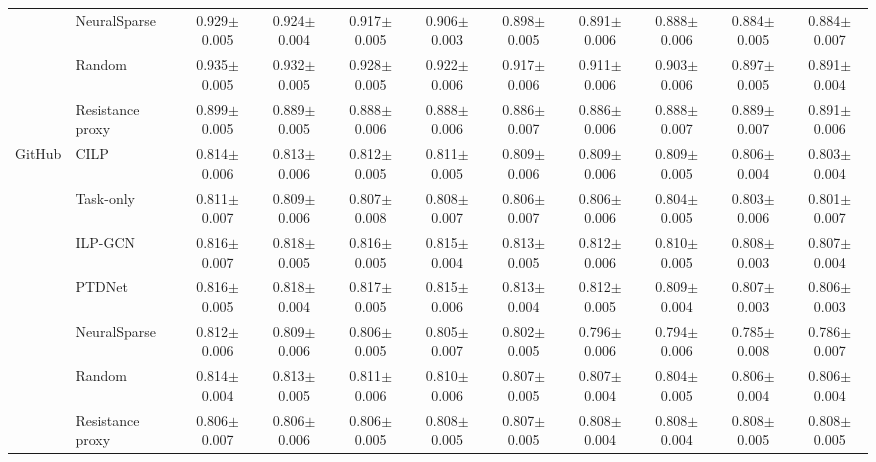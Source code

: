 \begin{center}
\begin{tabular}{@{}llccccccccc@{}}
 & NeuralSparse & 0.929$\pm$0.005 & 0.924$\pm$0.004 & 0.917$\pm$0.005 & 0.906$\pm$0.003 & 0.898$\pm$0.005 & 0.891$\pm$0.006 & 0.888$\pm$0.006 & 0.884$\pm$0.005 & 0.884$\pm$0.007 \\
 & Random & 0.935$\pm$0.005 & 0.932$\pm$0.005 & 0.928$\pm$0.005 & 0.922$\pm$0.006 & 0.917$\pm$0.006 & 0.911$\pm$0.006 & 0.903$\pm$0.006 & 0.897$\pm$0.005 & 0.891$\pm$0.004 \\
 & Resistance proxy & 0.899$\pm$0.005 & 0.889$\pm$0.005 & 0.888$\pm$0.006 & 0.888$\pm$0.006 & 0.886$\pm$0.007 & 0.886$\pm$0.006 & 0.888$\pm$0.007 & 0.889$\pm$0.007 & 0.891$\pm$0.006 \\
\midrule
GitHub & CILP & 0.814$\pm$0.006 & 0.813$\pm$0.006 & 0.812$\pm$0.005 & 0.811$\pm$0.005 & 0.809$\pm$0.006 & 0.809$\pm$0.006 & 0.809$\pm$0.005 & 0.806$\pm$0.004 & 0.803$\pm$0.004 \\
 & Task-only & 0.811$\pm$0.007 & 0.809$\pm$0.006 & 0.807$\pm$0.008 & 0.808$\pm$0.007 & 0.806$\pm$0.007 & 0.806$\pm$0.006 & 0.804$\pm$0.005 & 0.803$\pm$0.006 & 0.801$\pm$0.007 \\
 & ILP-GCN & 0.816$\pm$0.007 & 0.818$\pm$0.005 & 0.816$\pm$0.005 & 0.815$\pm$0.004 & 0.813$\pm$0.005 & 0.812$\pm$0.006 & 0.810$\pm$0.005 & 0.808$\pm$0.003 & 0.807$\pm$0.004 \\
 & PTDNet & 0.816$\pm$0.005 & 0.818$\pm$0.004 & 0.817$\pm$0.005 & 0.815$\pm$0.006 & 0.813$\pm$0.004 & 0.812$\pm$0.005 & 0.809$\pm$0.004 & 0.807$\pm$0.003 & 0.806$\pm$0.003 \\
 & NeuralSparse & 0.812$\pm$0.006 & 0.809$\pm$0.006 & 0.806$\pm$0.005 & 0.805$\pm$0.007 & 0.802$\pm$0.005 & 0.796$\pm$0.006 & 0.794$\pm$0.006 & 0.785$\pm$0.008 & 0.786$\pm$0.007 \\
 & Random & 0.814$\pm$0.004 & 0.813$\pm$0.005 & 0.811$\pm$0.006 & 0.810$\pm$0.006 & 0.807$\pm$0.005 & 0.807$\pm$0.004 & 0.804$\pm$0.005 & 0.806$\pm$0.004 & 0.806$\pm$0.004 \\
 & Resistance proxy & 0.806$\pm$0.007 & 0.806$\pm$0.006 & 0.806$\pm$0.005 & 0.808$\pm$0.005 & 0.807$\pm$0.005 & 0.808$\pm$0.004 & 0.808$\pm$0.004 & 0.808$\pm$0.005 & 0.808$\pm$0.005 \\
\bottomrule
\end{tabular}
\end{center}
